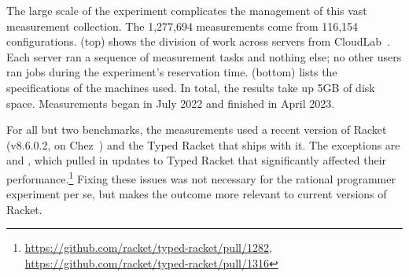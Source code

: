 
The large scale of the experiment complicates the management of this vast
measurement collection.
The 1,277,694 measurements come from 116,154
configurations.
 (top) shows the division of work across
servers from CloudLab~\cite{cloudlab}.
Each server ran a sequence of measurement tasks and nothing else;
no other users ran jobs during the experiment's reservation time.
 (bottom) lists the specifications of
the machines used.
In total, the results take up 5GB of disk space.
Measurements began in July 2022 and finished in April 2023.

For all but two benchmarks, the measurements used a recent version
of Racket (v8.6.0.2, on Chez~\cite{racket-chez}) and the Typed Racket that ships with it.
The exceptions are  and ,
which pulled in updates to Typed Racket that significantly affected
their performance.\footnote{\url{https://github.com/racket/typed-racket/pull/1282}, \url{https://github.com/racket/typed-racket/pull/1316}}
Fixing these issues was not necessary for the rational programmer experiment
per se, but makes the outcome more relevant to current versions of Racket.


